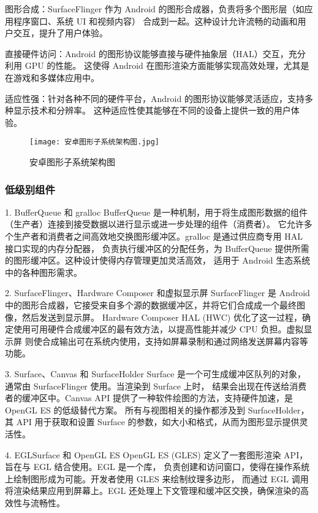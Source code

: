 图形合成：SurfaceFlinger 作为 Android 的图形合成器，负责将多个图形层（如应用程序窗口、系统 UI 和视频内容）
合成到一起。这种设计允许流畅的动画和用户交互，提升了用户体验。

直接硬件访问：Android 的图形协议能够直接与硬件抽象层（HAL）交互，充分利用 GPU 的性能。
这使得 Android 在图形渲染方面能够实现高效处理，尤其是在游戏和多媒体应用中。

适应性强：针对各种不同的硬件平台，Android 的图形协议能够灵活适应，支持多种显示技术和分辨率。
这种适应性使其能够在不同的设备上提供一致的用户体验。

\begin{figure}[h]
  \centering
  \texttt{[image: 安卓图形子系统架构图.jpg]}
  \caption{安卓图形子系统架构图}
\end{figure}

\subsubsection{低级别组件}

1. BufferQueue 和 gralloc
BufferQueue 是一种机制，用于将生成图形数据的组件（生产者）连接到接受数据以进行显示或进一步处理的组件（消费者）。
它允许多个生产者和消费者之间高效地交换图形缓冲区。gralloc 是通过供应商专用 HAL 接口实现的内存分配器，
负责执行缓冲区的分配任务，为 BufferQueue 提供所需的图形缓冲区。这种设计使得内存管理更加灵活高效，
适用于 Android 生态系统中的各种图形需求。

2. SurfaceFlinger、Hardware Composer 和虚拟显示屏
SurfaceFlinger 是 Android 中的图形合成器，它接受来自多个源的数据缓冲区，并将它们合成成一个最终图像，然后发送到显示屏。
Hardware Composer HAL (HWC) 优化了这一过程，确定使用可用硬件合成缓冲区的最有效方法，以提高性能并减少 CPU 负担。虚拟显示屏 
则使合成输出可在系统内使用，支持如屏幕录制和通过网络发送屏幕内容等功能。

3. Surface、Canvas 和 SurfaceHolder
Surface 是一个可生成缓冲区队列的对象，通常由 SurfaceFlinger 使用。当渲染到 Surface 上时，
结果会出现在传送给消费者的缓冲区中。Canvas API 提供了一种软件绘图的方法，支持硬件加速，是 OpenGL ES 的低级替代方案。
所有与视图相关的操作都涉及到 SurfaceHolder，其 API 用于获取和设置 Surface 的参数，如大小和格式，从而为图形显示提供灵活性。

4. EGLSurface 和 OpenGL ES
OpenGL ES (GLES) 定义了一套图形渲染 API，旨在与 EGL 结合使用。EGL 是一个库，
负责创建和访问窗口，使得在操作系统上绘制图形成为可能。开发者使用 GLES 来绘制纹理多边形，
而通过 EGL 调用将渲染结果应用到屏幕上。EGL 还处理上下文管理和缓冲区交换，确保渲染的高效性与流畅性。

